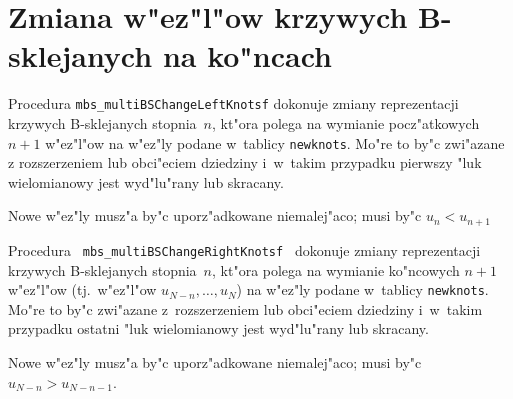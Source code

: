 \clearpage
\section{Zmiana w"ez"l"ow krzywych B-sklejanych na ko"ncach}

\begin{sloppypar}
\hspace{\parindent}
Procedura \texttt{mbs\_multiBSChangeLeftKnotsf} dokonuje zmiany
reprezentacji krzywych B-sklejanych stopnia~$n$, kt"ora polega na
wymianie pocz"atkowych $n+1$ w"ez"l"ow na w"ez"ly podane w~tablicy
\texttt{newknots}. Mo"re to by"c zwi"azane z rozszerzeniem lub obci"eciem
dziedziny i~w~takim przypadku pierwszy "luk wielomianowy jest wyd"lu"rany
lub skracany.
\end{sloppypar}

Nowe w"ez"ly musz"a by"c uporz"adkowane niemalej"aco; musi by"c
$u_n<u_{n+1}$

\vspace{\bigskipamount}
\begin{sloppypar}
Procedura \texttt{ mbs\_multiBSChangeRightKnotsf } dokonuje zmiany
reprezentacji krzy\-wych B-sklejanych stopnia~$n$, kt"ora polega na wymianie
ko"ncowych $n+1$ w"ez\-"l"ow (tj.\ w"ez"l"ow $u_{N-n},\ldots,u_N$)
na w"ez"ly podane w~tablicy \texttt{newknots}. Mo"re to by"c zwi"azane
z~rozszerzeniem lub obci"eciem dziedziny i~w~takim przypadku ostatni
"luk wielomianowy jest wyd"lu"rany lub skracany.
\end{sloppypar}

Nowe w"ez"ly musz"a by"c uporz"adkowane niemalej"aco; musi by"c
$u_{N-n}>u_{N-n-1}$.

